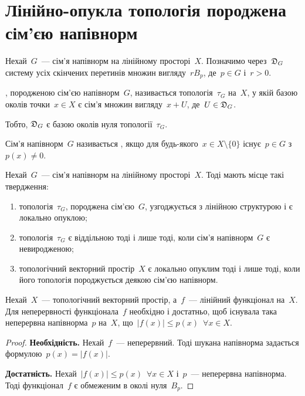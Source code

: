 \section{Лінійно-опукла топологія породжена сім'єю напівнорм}

\begin{definition}
    Нехай~$G$~--- сім'я напівнорм на лінійному просторі~$X$. Позначимо через~$\frak D_G$ систему усіх скінчених перетинів множин вигляду~$r B_p$, де~$p \in G$ і~$r > 0$.
    
    , породженою сім'єю напівнорм~$G$, називається топологія~$\tau_G$ на~$X$, у якій базою околів точки~$x \in X$ є сім'я множин вигляду~$x + U$, де~$U \in \frak D_G$.
\end{definition}

\begin{remark}
    Тобто, $\frak D_G$ є базою околів нуля топології~$\tau_G$.
\end{remark}

\begin{definition}
    Сім'я напівнорм~$G$ називається , якщо для будь-якого~$x \in X \setminus \{0\}$ існує~$p \in G$ з~$p(x) \ne 0$.
\end{definition}

\begin{theorem}
    Нехай~$G$~--- сім'я напівнорм на лінійному просторі~$X$. Тоді мають місце такі твердження:
    \begin{enumerate}
        \item топологія~$\tau_G$, породжена сім'єю~$G$, узгоджується з лінійною структурою і є локально опуклою;
        \item топологія~$\tau_G$ є віддільною тоді і лише тоді, коли сім'я напівнорм~$G$ є невиродженою;
        \item топологічний векторний простір~$X$ є локально опуклим тоді і лише тоді, коли його топологія породжується деякою сім'єю напівнорм.
    \end{enumerate}
\end{theorem}

\begin{theorem}
    Нехай~$X$~--- топологічний векторний простір, а~$f$~--- лінійний функціонал на~$X$. Для неперервності функціонала~$f$ необхідно і достатньо, щоб існувала така неперервна напівнорма~$p$ на~$X$, що~$|f(x)| \le p(x)$~$\forall x \in X$.
\end{theorem}

\begin{proof}
    \textbf{Необхідність.} Нехай~$f$~--- неперервний. Тоді шукана напівнорма задається формулою~$p(x) = |f(x)|$.

    \textbf{Достатність.} Нехай~$|f(x)| \le p(x)$~$\forall x \in X$ і~$p$~--- неперервна напівнорма. Тоді функціонал~$f$ є обмеженим в околі нуля~$B_p$. 
\end{proof}

